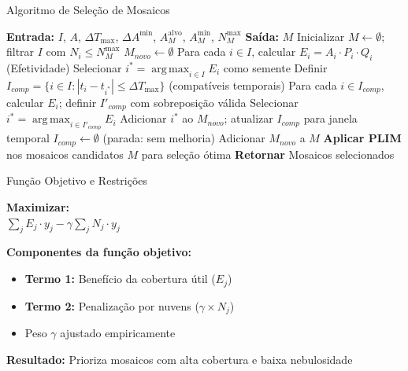 \documentclass[aspectratio=169,11pt]{beamer}
\DeclareMathOperator*{\argmax}{arg\,max}
\begin{document}
\begin{frame}{Algoritmo de Seleção de Mosaicos}
\vspace{-0.3cm}

\begin{algorithm}[H]
\tiny
\caption{Seleção de mosaicos candidatos}
\begin{algorithmic}[1]
\State%
\textbf{Entrada:} $I$, $A$, $\Delta T_{\max}$, $\Delta A^{\min}$, $A_M^{\text{alvo}}$, $A_M^{\min}$, $N_M^{\max}$
\State%
\textbf{Saída:} $M$
\State%
Inicializar $M \gets \emptyset$; filtrar $I$ com $N_i \leq N_M^{\max}$
    \State%
    $M_{novo} \gets \emptyset$
    \State%
    Para cada $i \in I$, calcular $E_i = A_i \cdot P_i \cdot Q_i$ (Efetividade)
    \State%
    Selecionar $i^* = \argmax_{i \in I} E_i$ como semente
    \State%
    Definir $I_{comp} = \{i \in I : |t_i - t_{i^*}| \leq \Delta T_{\max}\}$ (compatíveis temporais)
        \State%
        Para cada $i \in I_{comp}$, calcular $E_i$; definir $I'_{comp}$ com sobreposição válida
        \State%
        Selecionar $i^* = \argmax_{i \in I'_{comp}} E_i$
            \State%
            Adicionar $i^*$ ao $M_{novo}$; atualizar $I_{comp}$ para janela temporal
        \Else%
            \State%
            $I_{comp} \gets \emptyset$ (parada: sem melhoria)
        \EndIf%
    \EndWhile%
        \State%
        Adicionar $M_{novo}$ a $M$
    \EndIf%
\EndWhile%
\State%
\textbf{Aplicar PLIM} nos mosaicos candidatos $M$ para seleção ótima
\State%
\textbf{Retornar} Mosaicos selecionados
\end{algorithmic}
\end{algorithm}
\end{frame}

\begin{frame}{Função Objetivo e Restrições}
\vspace{-0.2cm}
\begin{center}
    \colorbox{ufal!10}{\parbox{8cm}{\centering
        \textbf{Maximizar:}\\[0.2cm]
        {\Large $\sum_j E_j \cdot y_j - \gamma \sum_j N_j \cdot y_j$}
    }}
\end{center}

\vspace{0.3cm}
\textbf{Componentes da função objetivo:}
\begin{itemize}
    \item \textbf{Termo 1:} Benefício da cobertura útil ($E_j$)
    \item \textbf{Termo 2:} Penalização por nuvens ($\gamma \times N_j$)
    \item Peso $\gamma$ ajustado empiricamente
\end{itemize}

\vspace{0.2cm}
\footnotesize\textbf{Resultado:} Prioriza mosaicos com alta cobertura e baixa nebulosidade
\end{frame}
\end{document}
